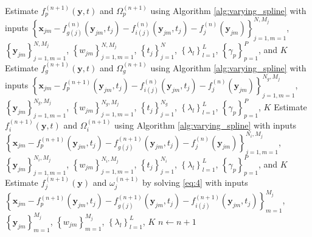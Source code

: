 \documentclass[11pt,reqno]{article}
\theoremstyle{definition}
\begin{document}
\begin{algorithm}
{    Estimate $f_{p}^{(n+1)}(\mathbf{y}, t)$ and $\Omega_{p}^{(n+1)}$ using Algorithm \ref{alg:varying_spline} with inputs $\left\{\mathbf{x}_{jm} - f_{g(j)}^{(n)}(\mathbf{y}_{jm}, t_j) - f_{i(j)}^{(n)}(\mathbf{y}_{jm}, t_j) - f_j^{(n)}(\mathbf{y}_{jm})\right\}_{j=1, m=1}^{N, M_j}$, $\left\{\mathbf{y}_{jm}\right\}_{j=1, m=1}^{N, M_j}$, $\left\{w_{jm}\right\}_{j=1, m=1}^{N, M_j}$, $\left\{t_{j}\right\}_{j=1}^{N}$, $\left\{\lambda_l\right\}_{l=1}^{L}$, $\left\{\gamma_p\right\}_{p=1}^{P}$, and $K$\;
     {
      Estimate $f_{g}^{(n+1)}(\mathbf{y}, t)$ and $\Omega_{g}^{(n+1)}$ using Algorithm \ref{alg:varying_spline} with inputs $\left\{\mathbf{x}_{jm} - f_{p}^{(n+1)}(\mathbf{y}_{jm}, t_j) - f_{i(j)}^{(n)}(\mathbf{y}_{jm}, t_j) - f_{j}^{(n)}(\mathbf{y}_{jm})\right\}_{j=1, m=1}^{N_g, M_j}$, $\left\{\mathbf{y}_{jm}\right\}_{j=1, m=1}^{N_g, M_j}$, $\left\{w_{jm}\right\}_{j=1, m=1}^{N_g, M_j}$, $\left\{t_j\right\}_{j=1}^{N_g}$, $\left\{\lambda_l\right\}_{l=1}^{L}$, $\left\{\gamma_p\right\}_{p=1}^{P}$, $K$\;
    }
     {
      Estimate $f_{i}^{(n+1)}(\mathbf{y}, t)$ and $\Omega_{i}^{(n+1)}$ using Algorithm \ref{alg:varying_spline} with inputs $\left\{\mathbf{x}_{jm} - f_{p}^{(n+1)}(\mathbf{y}_{jm}, t_j) - f_{g(j)}^{(n+1)}(\mathbf{y}_{jm}, t_j) - f_j^{(n)}(\mathbf{y}_{jm})\right\}_{j=1, m=1}^{N_i, M_j}$, $\left\{\mathbf{y}_{jm}\right\}_{j=1, m=1}^{N_i, M_j}$, $\left\{w_{jm}\right\}_{j=1, m=1}^{N_i, M_j}$, $\left\{t_j\right\}_{j=1}^{N_i}$, $\left\{\lambda_l\right\}_{l=1}^{L}$, $\left\{\gamma_p\right\}_{p=1}^{P}$, and $K$\;
    }
     {
      Estimate $f_{j}^{(n+1)}(\mathbf{y})$ and $\omega_{j}^{(n+1)}$ by solving \ref{eq:4} with inputs $\left\{\mathbf{x}_{jm} - f_{p}^{(n+1)}(\mathbf{y}_{jm}, t_j) - f_{g(j)}^{(n+1)}(\mathbf{y}_{jm}, t_j) - f_{i(j)}^{(n+1)}(\mathbf{y}_{jm}, t_j)\right\}_{m=1}^{M_j}$, $\left\{\mathbf{y}_{jm}\right\}_{m=1}^{M_j}$, $\left\{w_{jm}\right\}_{m = 1}^{M_j}$, $\left\{\lambda_l\right\}_{l=1}^{L}$, $K$\;
    }
    $n \gets n + 1$
  }
\end{algorithm}
\end{document}
